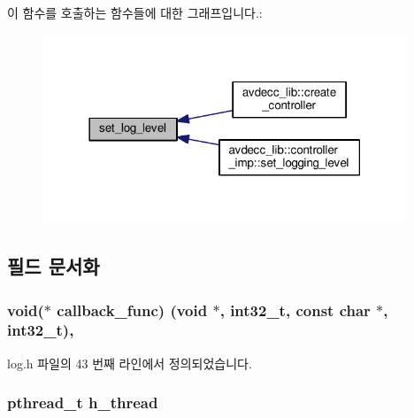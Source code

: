이 함수를 호출하는 함수들에 대한 그래프입니다.\+:
\nopagebreak
\begin{figure}[H]
\begin{center}
\leavevmode
\includegraphics[width=309pt]{classavdecc__lib_1_1log_ad2416d14295c0883c8b0f13cf36fe1db_icgraph}
\end{center}
\end{figure}




\subsection{필드 문서화}
\subsubsection[{\texorpdfstring{callback\+\_\+func}{callback_func}}]{\setlength{\rightskip}{0pt plus 5cm}void($\ast$ callback\+\_\+func) (void $\ast$, {\bf int32\+\_\+t}, const char $\ast$, {\bf int32\+\_\+t})\hspace{0.3cm}{\ttfamily [protected]}, {\ttfamily [inherited]}}\hypertarget{classavdecc__lib_1_1log_a1e4db5370768bd861a59049d170732bd}{}\label{classavdecc__lib_1_1log_a1e4db5370768bd861a59049d170732bd}


log.\+h 파일의 43 번째 라인에서 정의되었습니다.

\subsubsection[{\texorpdfstring{h\+\_\+thread}{h_thread}}]{\setlength{\rightskip}{0pt plus 5cm}pthread\+\_\+t h\+\_\+thread\hspace{0.3cm}{\ttfamily [private]}}\hypertarget{classavdecc__lib_1_1log__imp_a6e4816698fce9da1e93d69ecbcc78506}{}\label{classavdecc__lib_1_1log__imp_a6e4816698fce9da1e93d69ecbcc78506}


